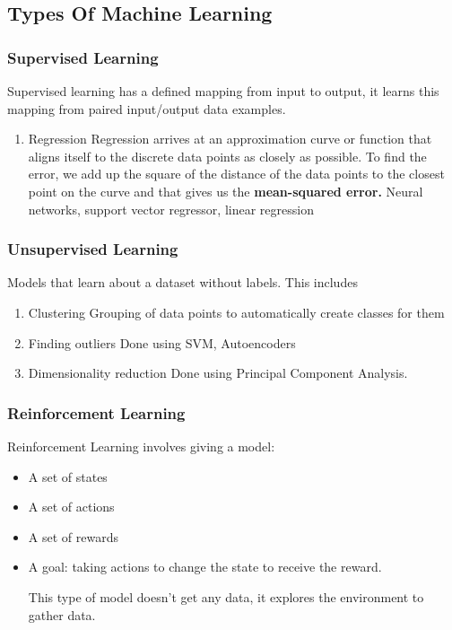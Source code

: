 \documentclass[11pt]{article}
\begin{document}
\subsection{Types Of Machine Learning}
\label{sec:orgbd9a561}
\subsubsection{Supervised Learning}
\label{sec:orge87493a}
Supervised learning has a defined mapping from input to output, it learns this mapping from paired input/output data examples.
\begin{enumerate}
\item Regression
\label{sec:org7a5c192}
Regression arrives at an approximation curve or function that aligns itself to the discrete data points as closely as possible.
To find the error, we add up the square of the distance of the data points to the closest point on the curve and that gives us the \textbf{mean-squared error.}
Neural networks, support vector regressor, linear regression
\end{enumerate}
\subsubsection{Unsupervised Learning}
\label{sec:orgcbc429e}
Models that learn about a dataset without labels.
This includes
\begin{enumerate}
\item Clustering
\label{sec:org3526dac}
Grouping of data points to automatically create classes for them
\item Finding outliers
\label{sec:orgc8aac35}
Done using SVM, Autoencoders
\item Dimensionality reduction
\label{sec:orge33ec92}
Done using Principal Component Analysis.
\end{enumerate}
\subsubsection{Reinforcement Learning}
\label{sec:org4d67fa7}
Reinforcement Learning involves giving a model:
\begin{itemize}
\item A set of states
\item A set of actions
\item A set of rewards
\item A goal: taking actions to change the state to receive the reward.

This type of model doesn't get any data, it explores the environment to gather data.
\end{itemize}
\end{document}

